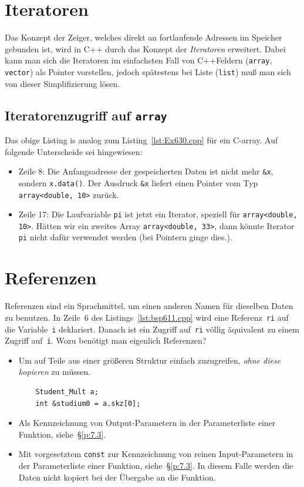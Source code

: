 %
%


\section{Iteratoren}
\label{p:6.3}
Das Konzept der Zeiger, welches direkt an fortlaufende Adressen im Speicher gebunden ist, 
wird in C++ durch das Konzept der \emph{Iteratoren} erweitert. 
Dabei kann man sich die Iteratoren im einfachsten Fall von C++Feldern 
(\texttt{array}, \texttt{vector}) als Pointer vorstellen, 
jedoch spätestens bei Liste (\texttt{list}) muß man sich von dieser Simplifizierung lösen.
%
%
\subsection{Iteratorenzugriff auf \texttt{array}}
%
%
%
Das obige Listing is analog zum Listing~\ref{lst:Ex630.cpp} für ein C-array. 
Auf folgende Unterscheide sei hingewiesen:
\begin{itemize}
	\item Zeile 8: Die Anfangsadresse der gespeicherten Daten ist nicht mehr \verb|&x|, sondern 
	   \verb|x.data()|. Der Ausdruck \verb|&x| liefert einen Pointer vom Typ \verb|array<double, 10>| zurück.
	\item Zeile 17: Die Laufvariable \verb|pi| ist jetzt ein Iterator, speziell für \verb|array<double, 10>|. 
	     Hätten wir ein zweites Array \verb|array<double, 33>|, dann könnte Iterator \verb|pi| nicht dafür 
	     verwendet werden (bei Pointern ginge dies.).
\end{itemize}




\section{Referenzen}
\label{p:6.1}
Referenzen sind ein Sprachmittel, um einen anderen Namen für dieselben Daten zu benutzen.
In Zeile~6 des Listings~\ref{lst:bsp611.cpp} wird eine Referenz~\texttt{ri} 
auf die Variable~\texttt{i} deklariert. Danach ist ein Zugriff auf~\texttt{ri} 
völlig äquivalent zu einem Zugriff auf~\texttt{i}.
%
%
Wozu benötigt man eigenlich Referenzen?
\begin{itemize}
	\item Um auf Teile aus einer größeren Struktur einfach zuzugreifen, 
	\emph{ohne diese kopieren} zu müssen. 
	\begin{verbatim}
	Student_Mult a;
	int &studium0 = a.skz[0];
	\end{verbatim}
	\item Als Kennzeichnung von Output-Parametern in der Parameterliste einer Funktion, siehe~\S\ref{p:7.3}.
	\item Mit vorgesetztem \texttt{const} zur Kennzeichnung von reinen Input-Parametern in der Parameterliste einer Funktion, siehe~\S\ref{p:7.3}. In diesem Falle werden die Daten nicht kopiert bei der Übergabe an die 
	Funktion. 
\end{itemize}


